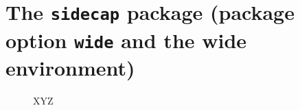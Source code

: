 \documentclass[12pt,draft,a4paper,twoside]{article}
\begin{document}
\tracingall {}
  
\section*{The \texttt{sidecap} package (package option \texttt{wide} and 
  the wide environment)}

\begin{SCfigure}[50][h]
  \caption{\CAPi}%
\end{SCfigure}

\vfill
\MARKER
\vfill

\begin{figure}[b]
  \begin{wide}
    \caption{XYZ \CAPi}%
  \end{wide}
\end{figure}

\clearpage

\begin{SCfigure}[50][h]
  \caption{\CAPi}%
\end{SCfigure}

\vfill
\MARKER
\vfill

\begin{figure}[b]
  \begin{wide}
    \caption{\CAPi}%
  \end{wide}
\end{figure}

\clearpage

\begin{SCfigure}[.9][t]
  \caption{\CAPi}%
\end{SCfigure}

\MARKER

\begin{wide}
\end{wide}

\vfill
\end{document}
